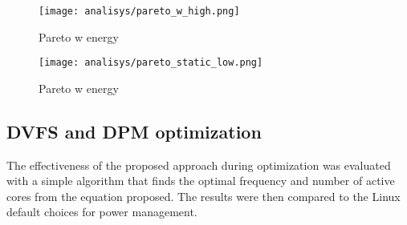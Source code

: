 \documentclass{ieeeaccess}
\begin{document}
\begin{figure}
    \centering
    \texttt{[image: analisys/pareto\_w\_high.png]}
    \caption{Pareto w energy}
    \label{fig:pareto_w_h}
\end{figure}

\begin{figure}
    \centering
    \texttt{[image: analisys/pareto\_static\_low.png]}
    \caption{Pareto w energy}
    \label{fig:pareto_w_l}
\end{figure}

\subsection{DVFS and DPM optimization} \label{sec:dvfs_optmin}
The effectiveness of the proposed approach during optimization was evaluated with a simple algorithm that finds the optimal frequency and number of active cores from the equation proposed. The results were then compared to the Linux default choices for power management.




\end{document}
